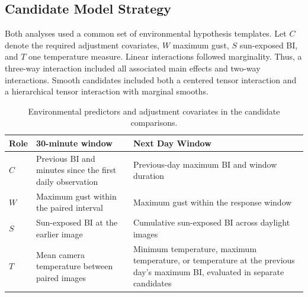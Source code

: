 \documentclass[insects,article,submit,pdftex,moreauthors]{Definitions/mdpi}
\begin{document}
\begin{appendix}
\section{Candidate Model Strategy}

Both analyses used a common set of environmental hypothesis templates. Let $C$ denote the required adjustment covariates, $W$ maximum gust, $S$ sun-exposed BI, and $T$ one temperature measure. Linear interactions followed marginality. Thus, a three-way interaction included all associated main effects and two-way interactions. Smooth candidates included both a centered tensor interaction and a hierarchical tensor interaction with marginal smooths.

\begin{table}[H]
\caption{Environmental predictors and adjustment covariates in the candidate comparisons.}
\label{tab:harmonized_predictors}
\begin{tabularx}{\textwidth}{@{}p{}XX@{}}
\toprule
\textbf{Role} & \textbf{30-minute window} & \textbf{Next Day Window} \\
\midrule
$C$ & Previous BI and minutes since the first daily observation & Previous-day maximum BI and window duration \\
$W$ & Maximum gust within the paired interval & Maximum gust within the response window \\
$S$ & Sun-exposed BI at the earlier image & Cumulative sun-exposed BI across daylight images \\
$T$ & Mean camera temperature between paired images & Minimum temperature, maximum temperature, or temperature at the previous day's maximum BI, evaluated in separate candidates \\
\bottomrule
\end{tabularx}
\end{table}


\end{appendix}
\end{document}
